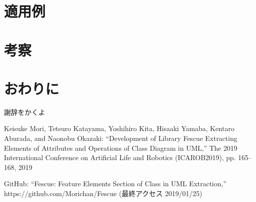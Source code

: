 \documentclass[uplatex, report, a4j, 10pt, dvipdfmx]{jsbook}
\begin{document}
\chapter{適用例}\label{cha:Indication}

\chapter{考察}\label{cha:Evaluation}

\chapter{おわりに} \label{cha:Conclusion}

%
\acknowledgment{}

謝辞をかくよ


%
\begin{thebibliography}{99}
   Keisuke Mori, Tetsuro Katayama, Yoshihiro Kita, Hisaaki Yamaba, Kentaro Aburada, and Naonobu Okazaki: ``Development of Library Fescue Extracting Elements of Attributes and Operations of Class Diagram in UML,'' The 2019 International Conference on Artificial Life and Robotics (ICAROB2019), pp. 165--168, 2019
  
   GitHub: ``Fescue: Feature Elements Section of Class in UML Extraction,'' https://github.com/Morichan/Fescue (最終アクセス 2019/01/25)
  \end{thebibliography}

%
\end{document}
